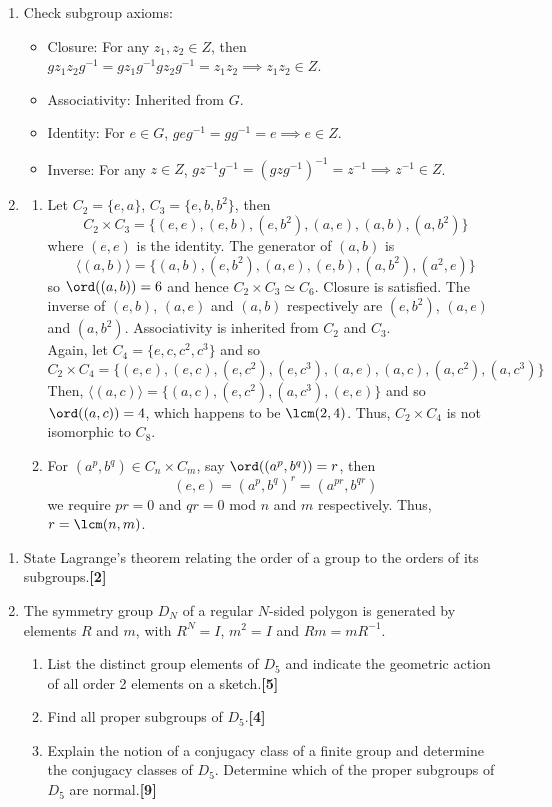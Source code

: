 \documentclass[a4paper]{article}
\begin{document}
\begin{ans}\leavevmode
\begin{enumerate}[label=(\roman*)]
\item Check subgroup axioms:
\begin{itemize}
    \item Closure: For any $z_1,z_2\in Z$, then $gz_1z_2g^{-1}=gz_1g^{-1}gz_2g^{-1}=z_1z_2\implies z_1z_2\in Z$.
    \item Associativity: Inherited from $G$.
    \item Identity: For $e\in G$, $geg^{-1}=gg^{-1}=e\implies e\in Z$.
    \item Inverse: For any $z\in Z$, $gz^{-1}g^{-1}=(gzg^{-1})^{-1}=z^{-1}\implies z^{-1}\in Z$.
\end{itemize}
\item 
\begin{enumerate}[label=(\alph*)]
\item Let $C_2=\{e,a\}$, $C_3=\{e,b,b^2\}$, then
$$C_2\times C_3=\{(e,e),(e,b),(e,b^2),(a,e),(a,b),(a,b^2)\}$$
where $(e,e)$ is the identity. The generator of $(a,b)$ is
$$\langle(a,b)\rangle=\{(a,b),(e,b^2),(a,e),(e,b),(a,b^2),(a^2,e)\}$$
so $\ord((a,b))=6$ and hence $C_2\times C_3\simeq C_6$. Closure is satisfied. The inverse of $(e,b)$, $(a,e)$ and $(a,b)$ respectively are $(e,b^2)$, $(a,e)$ and $(a,b^2)$. Associativity is inherited from $C_2$ and $C_3$.\\[5pt]
Again, let $C_4=\{e,c,c^2,c^3\}$ and so
$$C_2\times C_4=\{(e,e),(e,c),(e,c^2),(e,c^3),(a,e),(a,c),(a,c^2),(a,c^3)\}$$
Then, $\langle (a,c)\rangle=\{(a,c),(e,c^2),(a,c^3),(e,e)\}$ and so $\ord((a,c))=4$, which happens to be $\lcm(2,4)$. Thus, $C_2\times C_4$ is not isomorphic to $C_8$.
\item For $(a^p,b^q)\in C_n\times C_m$, say $\ord((a^p,b^q))=r$, then 
$$(e,e)=(a^p,b^q)^r=(a^{pr},b^{qr})$$
we require $pr=0$ and $qr=0$ mod $n$ and $m$ respectively. Thus, $r=\lcm(n,m)$.
\end{enumerate}
\end{enumerate}
\end{ans}
\newpage
\begin{qns}\leavevmode
\begin{enumerate}[label=(\roman*)]
\item State Lagrange’s theorem relating the order of a group to the orders of its subgroups.\hfill\textbf{[2]}
\item The symmetry group $D_N$ of a regular $N$-sided polygon is generated by elements $R$ and $m$, with $R^N= I$, $m^2 = I$ and $Rm = mR^{−1}$.
\begin{enumerate}[label=(\alph*)]
\item List the distinct group elements of $D_5$ and indicate the geometric action of all order 2 elements on a sketch.\hfill\textbf{[5]}
\item Find all proper subgroups of $D_5$.\hfill\textbf{[4]}
\item Explain the notion of a conjugacy class of a finite group and determine the conjugacy classes of $D_5$. Determine which of the proper subgroups of $D_5$ are normal.\hfill\textbf{[9]}
\end{enumerate}
\end{enumerate}
\end{qns}
\end{document}
